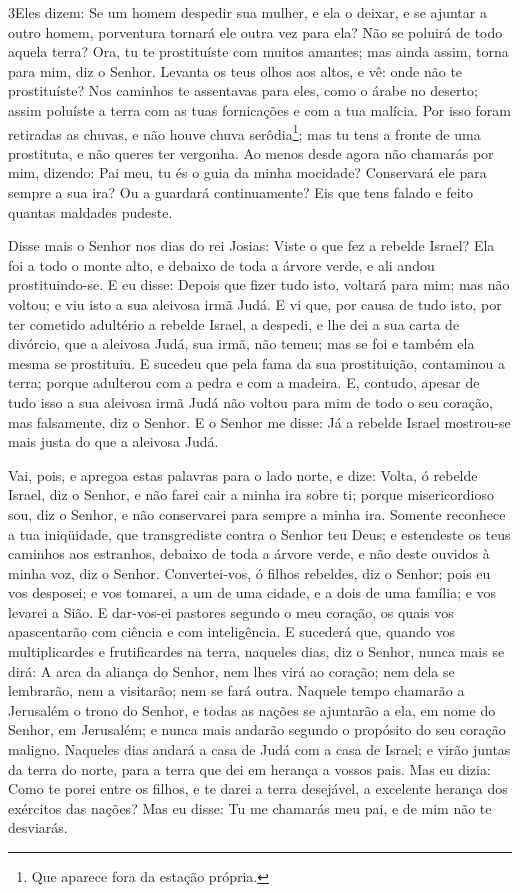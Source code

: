 \medskip

\lettrine{3} Eles dizem: Se um homem despedir sua mulher, e
ela o deixar, e se ajuntar a outro homem, porventura tornará ele
outra vez para ela? Não se poluirá de todo aquela terra? Ora, tu te
prostituíste com muitos amantes; mas ainda assim, torna para mim,
diz o Senhor. Levanta os teus olhos aos altos, e vê: onde não te
prostituíste? Nos caminhos te assentavas para eles, como o árabe no
deserto; assim poluíste a terra com as tuas fornicações e com a tua
malícia. Por isso foram retiradas as chuvas, e não houve chuva
serôdia\footnote{Que aparece fora da estação própria.}; mas tu tens
a fronte de uma prostituta, e não queres ter vergonha. Ao menos
desde agora não chamarás por mim, dizendo: Pai meu, tu és o guia da
minha mocidade? Conservará ele para sempre a sua ira? Ou a
guardará continuamente? Eis que tens falado e feito quantas maldades
pudeste.

Disse mais o Senhor nos dias do rei Josias: Viste o que fez a
rebelde Israel? Ela foi a todo o monte alto, e debaixo de toda a
árvore verde, e ali andou prostituindo-se. E eu disse: Depois
que fizer tudo isto, voltará para mim; mas não voltou; e viu isto a
sua aleivosa irmã Judá. E vi que, por causa de tudo isto, por
ter cometido adultério a rebelde Israel, a despedi, e lhe dei a sua
carta de divórcio, que a aleivosa Judá, sua irmã, não temeu; mas se
foi e também ela mesma se prostituiu. E sucedeu que pela fama da
sua prostituição, contaminou a terra; porque adulterou com a pedra e
com a madeira. E, contudo, apesar de tudo isso a sua aleivosa
irmã Judá não voltou para mim de todo o seu coração, mas falsamente,
diz o Senhor. E o Senhor me disse: Já a rebelde Israel
mostrou-se mais justa do que a aleivosa Judá.

Vai, pois, e apregoa estas palavras para o lado norte, e dize:
Volta, ó rebelde Israel, diz o Senhor, e não farei cair a minha ira
sobre ti; porque misericordioso sou, diz o Senhor, e não conservarei
para sempre a minha ira. Somente reconhece a tua iniqüidade,
que transgrediste contra o Senhor teu Deus; e estendeste os teus
caminhos aos estranhos, debaixo de toda a árvore verde, e não deste
ouvidos à minha voz, diz o Senhor. Convertei-vos, ó filhos
rebeldes, diz o Senhor; pois eu vos desposei; e vos tomarei, a um de
uma cidade, e a dois de uma família; e vos levarei a Sião. E
dar-vos-ei pastores segundo o meu coração, os quais vos apascentarão
com ciência e com inteligência. E sucederá que, quando vos
multiplicardes e frutificardes na terra, naqueles dias, diz o
Senhor, nunca mais se dirá: A arca da aliança do Senhor, nem lhes
virá ao coração; nem dela se lembrarão, nem a visitarão; nem se fará
outra. Naquele tempo chamarão a Jerusalém o trono do Senhor,
e todas as nações se ajuntarão a ela, em nome do Senhor, em
Jerusalém; e nunca mais andarão segundo o propósito do seu coração
maligno. Naqueles dias andará a casa de Judá com a casa de
Israel; e virão juntas da terra do norte, para a terra que dei em
herança a vossos pais. Mas eu dizia: Como te porei entre os
filhos, e te darei a terra desejável, a excelente herança dos
exércitos das nações? Mas eu disse: Tu me chamarás meu pai, e de mim
não te desviarás.

